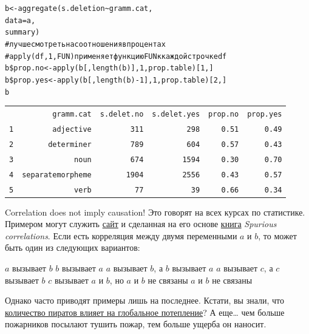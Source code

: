 \begin{frame}
\scriptsize
\begin{alltt}
b <- aggregate(s.deletion\textasciitilde gramm.cat, \\
                    data = a, \\
                    summary) \\
\alert{\# лучше смотреть на соотношения в процентах}\\
\alert{\# apply(df, 1, FUN) применяет функцию FUN к каждой строчке df}\\
b\$prop.no <- apply(b[,length(b)], 1, prop.table)[1,]\\
b\$prop.yes <- apply(b[,length(b)-1], 1, prop.table)[2,]\\
b\\
\begin{tabular}{rrrrrr}
\multicolumn{1}{l}{} & gramm.cat & \multicolumn{1}{l}{s.delet.no} & \multicolumn{1}{l}{s.delet.yes} & \alert{prop.no} & \alert{prop.yes} \\ 
1 & adjective & 311 & 298 & \alert{0.51} & \alert{0.49} \\ 
2 & determiner & 789 & 604 & \alert{0.57} & \alert{0.43} \\ 
3 & noun & 674 & 1594 & \alert{0.30} & \alert{0.70} \\ 
4 & separate morpheme & 1904 & 2556 & \alert{0.43} & \alert{0.57} \\ 
5 & verb & 77 & 39 & \alert{0.66} & \alert{0.34} \\ 
\end{tabular}
\end{alltt}
\normalsize
\end{frame}
\begin{frame}{Correlation does not imply causation!}
Это говорят на всех курсах по статистике. Примером могут служить \href{http://tylervigen.com/spurious-correlations}{\alert{сайт}} и сделанная на его основе \href{http://www.indiebound.org/book/9780316339438}{\alert{книга}} \textit{Spurious correlations}.
\vfill
Если есть корреляция между двумя переменными $a$ и $b$, то может быть один из следующих вариантов:
\begin{itemize}
\mytem $a$ вызывает $b$
\mytem $b$ вызывает $a$
\mytem $a$ вызывает $b$, а $b$ вызывает $a$
\mytem $a$ вызывает $c$, а $c$ вызывает $b$
\mytem $c$ вызывает $a$ и $b$, но $a$ и $b$ не связаны
\mytem $a$ и $b$ не связаны
\end{itemize}
\vfill
Однако часто приводят примеры лишь на последнее. Кстати, вы знали, что \href{https://upload.wikimedia.org/wikipedia/commons/e/e6/PiratesVsTemp.svg}{\alert{количество пиратов влияет на глобальное потепление}}? А еще… чем больше пожарников посылают тушить пожар, тем больше ущерба он наносит.
\end{frame}
